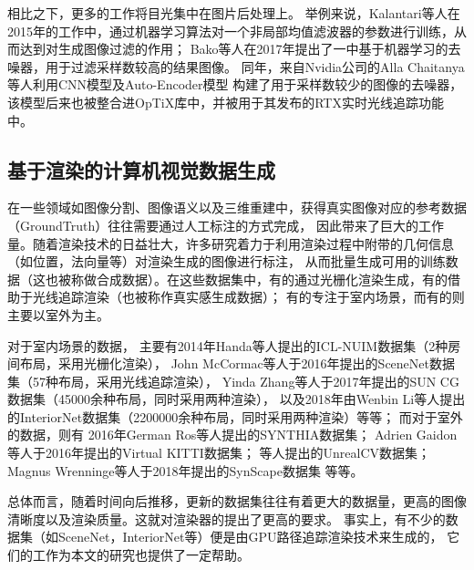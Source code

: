 相比之下，更多的工作将目光集中在图片后处理上。
举例来说，Kalantari等人在2015年的工作中\cite{MachingLearning1}，通过机器学习算法对一个非局部均值滤波器的参数进行训练，从而达到对生成图像过滤的作用；
Bako等人在2017年提出了一中基于机器学习的去噪器\cite{MachingLearningDenoiser}，用于过滤采样数较高的结果图像。
同年，来自Nvidia公司的Alla Chaitanya等人利用CNN模型及Auto-Encoder模型
构建了用于采样数较少的图像的去噪器\cite{NvidiaDenoiser}，
该模型后来也被整合进OpTiX库中，并被用于其发布的RTX实时光线追踪功能中\cite{RTXDenoiser}。

\subsection{基于渲染的计算机视觉数据生成}

在一些领域如图像分割、图像语义以及三维重建中，获得真实图像对应的参考数据（GroundTruth）往往需要通过人工标注的方式完成，
因此带来了巨大的工作量。随着渲染技术的日益壮大，许多研究着力于利用渲染过程中附带的几何信息（如位置，法向量等）对渲染生成的图像进行标注，
从而批量生成可用的训练数据（这也被称做合成数据）。在这些数据集中，有的通过光栅化渲染生成，有的借助于光线追踪渲染（也被称作真实感生成数据）；
有的专注于室内场景，而有的则主要以室外为主。

对于室内场景的数据，
主要有2014年Handa等人提出的ICL-NUIM数据集\cite{ICLNUIM}（2种房间布局，采用光栅化渲染），
John McCormac等人于2016年提出的SceneNet数据集\cite{SceneNet}（57种布局，采用光线追踪渲染），
Yinda Zhang等人于2017年提出的SUN CG数据集\cite{SUNCG}（45000余种布局，同时采用两种渲染），
以及2018年由Wenbin Li等人提出的InteriorNet数据集\cite{InteriorNet}（2200000余种布局，同时采用两种渲染）等等；
而对于室外的数据，则有
2016年German Ros等人提出的SYNTHIA数据集；%
Adrien Gaidon等人于2016年提出的Virtual KITTI数据集；%
等人提出的UnrealCV数据集；%
Magnus Wrenninge等人于2018年提出的SynScape数据集%
等等。

总体而言，随着时间向后推移，更新的数据集往往有着更大的数据量，更高的图像清晰度以及渲染质量。这就对渲染器的提出了更高的要求。
事实上，有不少的数据集（如SceneNet，InteriorNet等）便是由GPU路径追踪渲染技术来生成的，
它们的工作为本文的研究也提供了一定帮助。